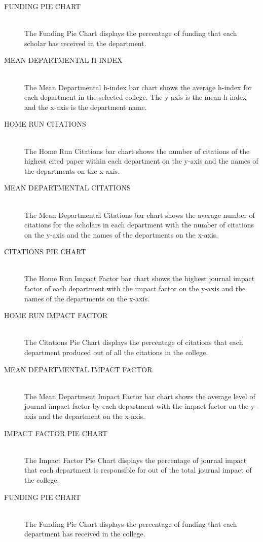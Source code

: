 \begin{description}
  \item[FUNDING PIE CHART] \hfill \\
  The Funding Pie Chart displays the percentage of funding that each scholar has received in the department.
  \item[MEAN DEPARTMENTAL H-INDEX] \hfill \\
  The Mean Departmental h-index bar chart shows the average h-index for each department in the selected college. The y-axis is the mean h-index and the x-axis is the department name.
  \item[HOME RUN CITATIONS] \hfill \\
  The Home Run Citations bar chart shows the number of citations of the highest cited paper within each department on the y-axis and the names of the departments on the x-axis.
  \item[MEAN DEPARTMENTAL CITATIONS] \hfill \\
  The Mean Departmental Citations bar chart shows the average number of citations for the scholars in each department with the number of citations on the y-axis and the names of the departments on the x-axis.
  \item[CITATIONS PIE CHART] \hfill \\
  The Home Run Impact Factor bar chart shows the highest journal impact factor of each department with the impact factor on the y-axis and the names of the departments on the x-axis.
  \item[HOME RUN IMPACT FACTOR] \hfill \\
  The Citations Pie Chart displays the percentage of citations that each department produced out of all the citations in the college.
  \item[MEAN DEPARTMENTAL IMPACT FACTOR] \hfill \\
  The Mean Department Impact Factor bar chart shows the average level of journal impact factor by each department with the impact factor on the y-axis and the department on the x-axis.
  \item[IMPACT FACTOR PIE CHART] \hfill \\
  The Impact Factor Pie Chart displays the percentage of journal impact that each department is responsible for out of the total journal impact of the college.
  \item[FUNDING PIE CHART] \hfill \\
  The Funding Pie Chart displays the percentage of funding that each department has received in the college.
\end{description}




